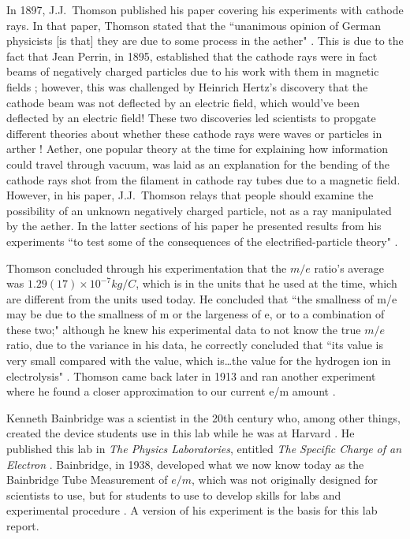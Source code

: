 \documentclass[aps,prl,10pt,twocolumn,floatfix]{revtex4-2}
\begin{document}
In 1897, J.J.~Thomson published his paper covering his experiments with cathode rays.
In that paper, Thomson stated that the ``unanimous opinion of German physicists [is that] they are due to some process in the aether" \cite{CathodeRays}.
This is due to the fact that Jean Perrin, in 1895, established that the cathode rays were in fact beams of negatively charged particles due to his work with them in magnetic fields \cite{Perrin};
however, this was challenged by Heinrich Hertz's discovery that the cathode beam was not deflected by an electric field, which would've been deflected by an electric field!
These two discoveries led scientists to propgate different theories about whether these cathode rays were waves or particles in arther \cite{Hertz}! 
Aether, one popular theory at the time for explaining how information could travel through vacuum, was laid as an explanation for the bending of the cathode rays shot from the filament in cathode ray tubes due to a magnetic field.
However, in his paper, J.J.~Thomson relays that people should examine the possibility of an unknown negatively charged particle, not as a ray manipulated by the aether.
In the latter sections of his paper he presented results from his experiments ``to test some of the consequences of the electrified-particle theory" \cite{CathodeRays}.

Thomson concluded through his experimentation that the $m/e$ ratio's average was  $1.29(17)\!\times\!10^{-7} kg/C$, which is in the units that he used at the time, which are different from the units used today.
He concluded that ``the smallness of m/e may be due to the smallness of m or the largeness of e, or to a combination
of these two;"
although he knew his experimental data to not know the true $m/e$ ratio, due to the variance in his data, he correctly concluded that ``its value is very small compared with the value, which is\ldots the value for the hydrogen ion in electrolysis" \cite{CathodeRays}.
Thomson came back later in 1913 and ran another experiment where he found a closer approximation to our current e/m amount \cite{Wiki}.

Kenneth Bainbridge was a scientist in the 20th century who, among other things, created the device students use in this lab while he was at Harvard \cite{Bainbridge}.
He published this lab in \textit{The Physics Laboratories}, entitled \textit{The Specific Charge of an Electron} \cite{Bainbridge}.
Bainbridge, in 1938, developed what we now know today as the Bainbridge Tube Measurement of $e/m$, which was not originally designed for scientists to use, but for students to use to develop skills for labs and experimental procedure \cite{Bainbridge}.
A version of his experiment is the basis for this lab report.
\end{document}
